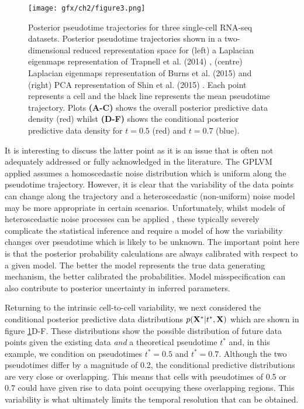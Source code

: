 \begin{figure}
\centering
	\texttt{[image: gfx/ch2/figure3.png]}
  	\caption{Posterior pseudotime trajectories for three single-cell RNA-seq datasets. Posterior pseudotime trajectories shown in a two-dimensional reduced representation space for (left) a Laplacian eigenmaps representation of Trapnell et al. (2014) \cite{Trapnell2014-xi}, (centre) Laplacian eigenmaps representation of Burns et al. (2015) \cite{Burns2015} and (right) PCA representation of Shin et al. (2015) \cite{Shin2015}. Each point represents a cell and the black line represents the mean pseudotime trajectory. Plots \textbf{(A-C)} shows the overall posterior predictive data density (red) whilst \textbf{(D-F)} shows the conditional posterior predictive data density for $t = 0.5$ (red) and $t = 0.7$ (blue). }
  	\label{fig:posmean}
\end{figure}

It is interesting to discuss the latter point as it is an issue that is often not adequately addressed or fully acknowledged in the literature. The GPLVM applied assumes a homoscedastic noise distribution which is uniform along the pseudotime trajectory. However, it is clear that the variability of the data points can change along the trajectory and a heteroscedastic (non-uniform) noise model may be more appropriate in certain scenarios. Unfortunately, whilst models of heteroscedastic noise processes can be applied \cite{le2005heteroscedastic}, these typically severely complicate the statistical inference and require a model of how the variability changes over pseudotime which is likely to be unknown. The important point here is that the posterior probability calculations are always calibrated with respect to a given model. The better the model represents the true data generating mechanism, the better calibrated the probabilities. Model misspecification can also contribute to posterior uncertainty in inferred parameters.

Returning to the intrinsic cell-to-cell variability, we next considered the conditional posterior predictive data distributions $p({\bf X}^*|t^*, {\bf X})$ which are shown in figure \ref{fig:posmean}D-F. These distributions show the possible distribution of future data points given the existing data \emph{and} a theoretical pseudotime $t^*$ and, in this example, we condition on pseudotimes $t^* = 0.5$ and $t^* = 0.7$. Although the two pseudotimes differ by a magnitude of 0.2, the conditional predictive distributions are very close or overlapping. This means that cells with pseudotimes of 0.5 or 0.7 could have given rise to data point occupying these overlapping regions. This variability is what ultimately limits the temporal resolution that can be obtained.


